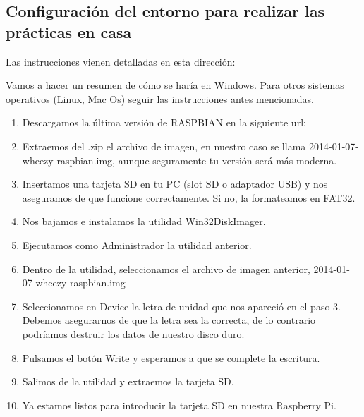 \subsection{Configuración del entorno para realizar las prácticas en casa}

Las instrucciones vienen detalladas en esta dirección:\newline
\hspace{2.5cm}{\bf http://elinux.org/RPi\_Easy\_SD\_Card\_Setup}

Vamos a hacer un resumen de cómo se haría en Windows. Para otros
sistemas operativos (Linux, Mac Os) seguir las instrucciones antes mencionadas.

\begin{enumerate}
  \item Descargamos la última versión de RASPBIAN en la siguiente url: \newline
\hspace{2.5cm}{\bf http://www.raspberrypi.org/downloads/}
  \item Extraemos del .zip el archivo de imagen, en nuestro caso se llama
        2014-01-07-wheezy-raspbian.img, aunque seguramente tu versión será más moderna.
  \item Insertamos una tarjeta SD en tu PC (slot SD o adaptador USB) y nos aseguramos de que
        funcione correctamente. Si no, la formateamos en FAT32.
  \item Nos bajamos e instalamos la utilidad Win32DiskImager. \newline
\hspace{2.5cm}{\bf http://sourceforge.net/projects/win32diskimager}
  \item Ejecutamos como Administrador la utilidad anterior.
  \item Dentro de la utilidad, seleccionamos el archivo de imagen anterior,
        2014-01-07-wheezy-raspbian.img
  \item Seleccionamos en Device la letra de unidad que nos apareció en el paso 3.
        Debemos asegurarnos de que la letra sea la correcta, de lo contrario
        podríamos destruir los datos de nuestro disco duro.
  \item Pulsamos el botón Write y esperamos a que se complete la escritura.
  \item Salimos de la utilidad y extraemos la tarjeta SD.
  \item Ya estamos listos para introducir la tarjeta SD en nuestra Raspberry Pi.
\end{enumerate}

